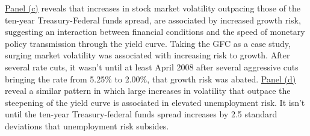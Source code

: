\documentclass[12pt]{article}
\newcommand{\resultsdate}{2026-02-05}
\begin{document}
\href{../results_figures/\resultsdate/interaction_3d_spline_requested_quantiles/spline3d_dmqv0c_ip_yoy_q5_rates_10_yr_ff_spread_vs_stocks_vix.html}{Panel (c)} reveals that increases in stock market volatility outpacing those of the ten-year Treasury-Federal funds spread, are associated by increased growth risk, suggesting an interaction between financial conditions and the speed of monetary policy transmission through the yield curve. Taking the GFC as a case study, surging market volatility was associated with increasing risk to growth. After several rate cuts, it wasn't until at least April 2008 after several aggressive cuts bringing the rate from 5.25\% to 2.00\%, that growth risk was abated. \href{../results_figures/\resultsdate/interaction_3d_spline_requested_quantiles/spline3d_dmqv0c_unrate_yoy_q95_rates_10_yr_ff_spread_vs_stocks_vix.html}{Panel (d)} reveal a similar pattern in which large increases in volatility that outpace the steepening of the yield curve is associated in elevated unemployment risk. It isn't until the ten-year Treasury-federal funds spread increases by 2.5 standard deviations that unemployment risk subsides.  













\end{document}
